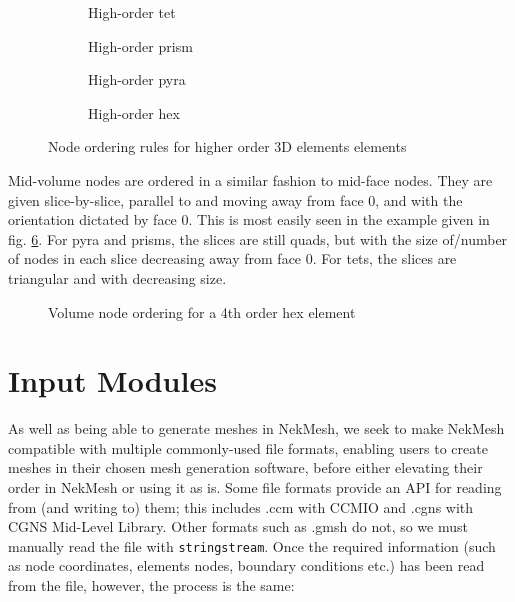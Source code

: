 {\begin{figure}[h!]
    \centering
    \begin{subfigure}[b]{0.45\textwidth}
        \centering
        
        \caption{High-order tet}
        \label{fig:ho_tet}
    \end{subfigure}
    \hfill
    \begin{subfigure}[b]{0.45\textwidth}
        \centering
        
        \caption{High-order prism}
        \label{fig:ho_prism}
    \end{subfigure}
    \begin{subfigure}[b]{0.45\textwidth}
        \centering
       \resizebox{1.25\textwidth}{!}{}
        \caption{High-order pyra}
        \label{fig:ho_pyra}
    \end{subfigure}
    \hfill
    \begin{subfigure}[b]{0.45\textwidth}
        \centering
        \resizebox{1.1\textwidth}{!}{}
        \caption{High-order hex}
        \label{fig:ho_hex}
    \end{subfigure}
    \caption{Node ordering rules for higher order 3D elements elements}
    \label{fig:ho_3D_elements}
\end{figure}

Mid-volume nodes are ordered in a similar fashion to mid-face
nodes. They are given slice-by-slice, parallel to and moving away from
face 0, and with the orientation dictated by face 0. This is most
easily seen in the example given in fig. \ref{fig:vol_nodes}. For pyra
and prisms, the slices are still quads, but with the size of/number of
nodes in each slice decreasing away from face 0. For tets, the slices
are triangular and with decreasing size.

\begin{figure}[h!]
  \centering
  
  \caption{Volume node ordering for a 4th order hex element}
  \label{fig:vol_nodes}
\end{figure}

\section{Input Modules}
As well as being able to generate meshes in NekMesh, we seek to make
NekMesh compatible with multiple commonly-used file formats, enabling
users to create meshes in their chosen mesh generation software,
before either elevating their order in NekMesh or using it as is. Some
file formats provide an API for reading from (and writing to) them;
this includes .ccm with CCMIO and .cgns with CGNS Mid-Level
Library. Other formats such as .gmsh do not, so we must manually read
the file with \texttt{stringstream}. Once the required information
(such as node coordinates, elements nodes, boundary conditions etc.)
has been read from the file, however, the process is the same:

}
